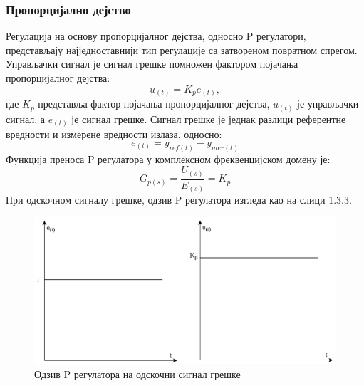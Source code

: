 \documentclass[12pt]{article}
\begin{document}
\subsubsection{Пропорцијално дејство}
Регулација на основу пропорцијалног дејства, односно P регулатори, представљају најједноставнији тип регулације са затвореном повратном спрегом. Управљачки сигнал је сигнал грешке помножен фактором појачања пропорцијалног дејства:
\begin{equation}
    u_{(t)} = K_p e_{(t)},
\end{equation}
где $K_p$ представља фактор појачања пропорцијалног дејства, $u_{(t)}$ је управљачки сигнал, а $e_{(t)}$ је сигнал грешке. Сигнал грешке је једнак разлици референтне вредности и измерене вредности излаза, односно:
\begin{equation}
    e_{(t)}=y_{ref(t)} - y_{mer(t)}
\end{equation}
Функција преноса P регулатора у комплексном фреквенцијском домену је:
\begin{equation}
    G_{p(s)} = \dfrac{U_{(s)}}{E_{(s)}} = K_p
\end{equation}
При одскочном сигналу грешке, одзив P регулатора изгледа као на слици 1.3.3.
\begin{figure}[H]
    \centering
    \includegraphics[width=13cm]{figures/p.drawio.png}
    \caption{Одзив P регулатора на одскочни сигнал грешке}
    \label{fig:P_одзив}
\end{figure}
\end{document}
